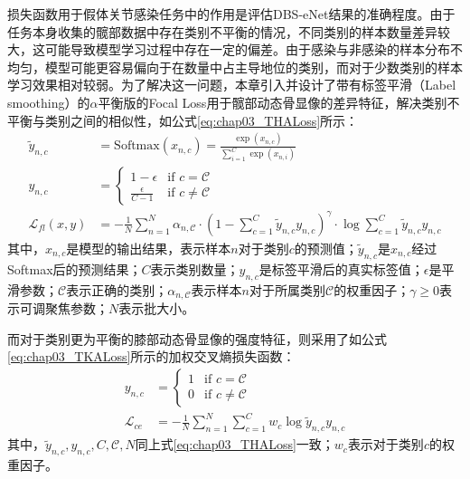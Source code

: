 损失函数用于假体关节感染任务中的作用是评估DBS-eNet结果的准确程度。由于任务本身收集的髋部数据中存在类别不平衡的情况，不同类别的样本数量差异较大，这可能导致模型学习过程中存在一定的偏差。由于感染与非感染的样本分布不均匀，模型可能更容易偏向于在数量中占主导地位的类别，而对于少数类别的样本学习效果相对较弱。为了解决这一问题，本章引入并设计了带有标签平滑（Label smoothing）\cite{zhang2021delving}的\(\alpha\)平衡版的Focal Loss\cite{lin2017focal}用于髋部动态骨显像的差异特征，解决类别不平衡与类别之间的相似性，如公式\ref{eq:chap03_THALoss}所示：
\begin{equation}
  \begin{aligned}
    \tilde{y}_{n, c}      & =  \text{Softmax}(x_{n, c}) = \frac{\exp(x_{n, c})}{\sum_{i = 1}^{C}\exp(x_{n, i})}                                                                       \\
    y_{n, c}              & =
    \begin{cases}
      1 - \epsilon         & \text{if \(c = \mathcal{C}\)}    \\
      \frac{\epsilon}{C-1} & \text{if \(c \neq \mathcal{C}\)}
    \end{cases}                                                                                                                \\
    \mathcal{L}_{fl}(x,y) & = -\frac{1}{N}\sum_{n=1}^N \alpha_{n,\mathcal{C}} \cdot (1 - \sum_{c=1}^C \tilde{y}_{n,c}y_{n,c})^{\gamma} \cdot \log\sum_{c=1}^{C}\tilde{y}_{n,c}y_{n,c}
  \end{aligned}
  \label{eq:chap03_THALoss}
\end{equation}
其中，\(x_{n,c}\)是模型的输出结果，表示样本\(n\)对于类别\(c\)的预测值；\(\tilde{y}_{n, c}\)是\(x_{n,c}\)经过Softmax后的预测结果；\(C\)表示类别数量；\(y_{n,c}\)是标签平滑后的真实标签值；\(\epsilon\)是平滑参数；\(\mathcal{C}\)表示正确的类别；\(\alpha_{n,\mathcal{C}}\)表示样本\(n\)对于所属类别\(\mathcal{C}\)的权重因子；\(\gamma \geq 0\)表示可调聚焦参数；\(N\)表示批大小。

而对于类别更为平衡的膝部动态骨显像的强度特征，则采用了如公式\ref{eq:chap03_TKALoss}所示的加权交叉熵损失函数：
\begin{equation}
  \begin{aligned}
    y_{n, c}         & =
    \begin{cases}
      1 & \text{if \(c = \mathcal{C}\)}    \\
      0 & \text{if \(c \neq \mathcal{C}\)}
    \end{cases}                                         \\
    \mathcal{L}_{ce} & = -\frac{1}{N}\sum_{n=1}^N\sum_{c=1}^C w_c\log\tilde{y}_{n,c}y_{n,c}
  \end{aligned}
  \label{eq:chap03_TKALoss}
\end{equation}
其中，\(\tilde{y}_{n, c},y_{n,c},C,\mathcal{C},N\)同上式\ref{eq:chap03_THALoss}一致；\(w_c\)表示对于类别\(c\)的权重因子。


